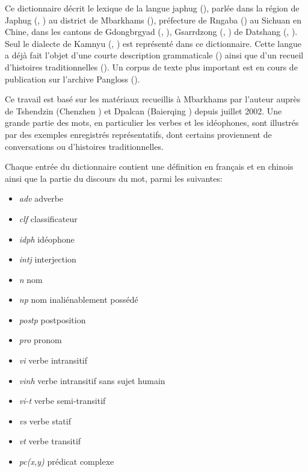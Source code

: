 Ce  dictionnaire décrit le lexique de la langue japhug (), parlée dans la région de Japhug (, ) au district de Mbarkhams (), préfecture de Rngaba () au Sichuan en Chine, dans les cantons de Gdongbrgyad (, ), Gsarrdzong (,   ) de Datshang (, ). Seul le dialecte de Kamnyu (, ) est représenté dans ce dictionnaire. Cette langue a déjà fait l'objet d'une courte description grammaticale (\citealt{jacques08}) ainsi que d'un recueil d'histoires traditionnelles (\citealt{jacques10gesar}). Un corpus de texte plus important est en cours de publication sur l'archive Pangloss (\citealt{michailovsky14pangloss}).

Ce travail est basé sur les matériaux recueillis à Mbarkhams par l'auteur auprès de Tshendzin (Chenzhen ) et Dpalcan (Baierqing ) depuis juillet 2002. Une grande partie des mots, en particulier les verbes et les idéophones, sont illustrés par des exemples enregistrés représentatifs, dont certains proviennent de conversations ou d'histoires traditionnelles.

Chaque entrée du dictionnaire contient une définition en français et en chinois ainsi que la partie du discours du mot, parmi les suivantes:

\begin{itemize}
\item \textit{adv} adverbe
\item \textit{clf} classificateur
\item \textit{idph} idéophone
\item \textit{intj} interjection
\item \textit{n} nom
\item \textit{np} nom inaliénablement possédé 
\item \textit{postp} postposition
\item \textit{pro} pronom
\item \textit{vi} verbe intransitif
\item \textit{vinh} verbe intransitif sans sujet humain
\item \textit{vi-t} verbe semi-transitif
\item \textit{vs} verbe statif
\item \textit{vt} verbe transitif
\item \textit{pc(x,y)} prédicat complexe 
\end{itemize}

